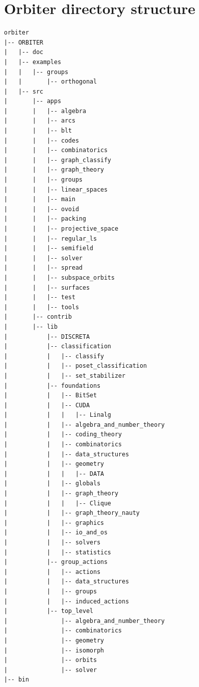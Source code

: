 \section{Orbiter directory structure}
\label{app:dir}

\begin{verbatim}
orbiter
|-- ORBITER
|   |-- doc
|   |-- examples
|   |   |-- groups
|   |       |-- orthogonal
|   |-- src
|       |-- apps
|       |   |-- algebra
|       |   |-- arcs
|       |   |-- blt
|       |   |-- codes
|       |   |-- combinatorics
|       |   |-- graph_classify
|       |   |-- graph_theory
|       |   |-- groups
|       |   |-- linear_spaces
|       |   |-- main
|       |   |-- ovoid
|       |   |-- packing
|       |   |-- projective_space
|       |   |-- regular_ls
|       |   |-- semifield
|       |   |-- solver
|       |   |-- spread
|       |   |-- subspace_orbits
|       |   |-- surfaces
|       |   |-- test
|       |   |-- tools
|       |-- contrib
|       |-- lib
|           |-- DISCRETA
|           |-- classification
|           |   |-- classify
|           |   |-- poset_classification
|           |   |-- set_stabilizer
|           |-- foundations
|           |   |-- BitSet
|           |   |-- CUDA
|           |   |   |-- Linalg
|           |   |-- algebra_and_number_theory
|           |   |-- coding_theory
|           |   |-- combinatorics
|           |   |-- data_structures
|           |   |-- geometry
|           |   |   |-- DATA
|           |   |-- globals
|           |   |-- graph_theory
|           |   |   |-- Clique
|           |   |-- graph_theory_nauty
|           |   |-- graphics
|           |   |-- io_and_os
|           |   |-- solvers
|           |   |-- statistics
|           |-- group_actions
|           |   |-- actions
|           |   |-- data_structures
|           |   |-- groups
|           |   |-- induced_actions
|           |-- top_level
|               |-- algebra_and_number_theory
|               |-- combinatorics
|               |-- geometry
|               |-- isomorph
|               |-- orbits
|               |-- solver
|-- bin
\end{verbatim}